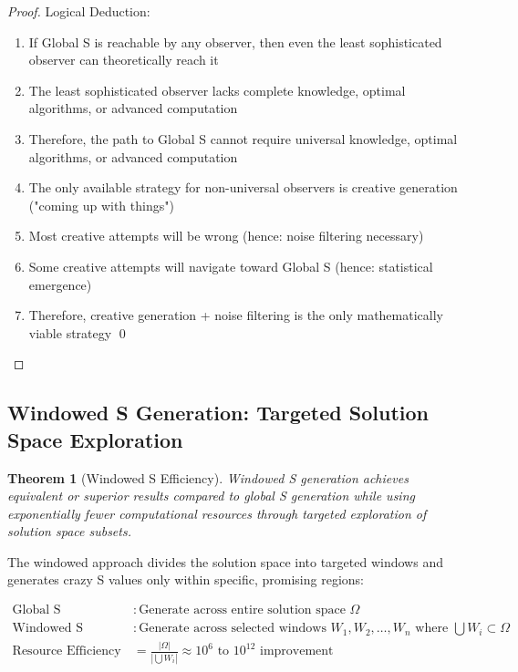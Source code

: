 \documentclass[12pt,a4paper]{article}
\newtheorem{theorem}{Theorem}[section]
\begin{document}
{\begin{proof}
Logical Deduction:
\begin{enumerate}
\item If Global S is reachable by any observer, then even the least sophisticated observer can theoretically reach it
\item The least sophisticated observer lacks complete knowledge, optimal algorithms, or advanced computation
\item Therefore, the path to Global S cannot require universal knowledge, optimal algorithms, or advanced computation
\item The only available strategy for non-universal observers is creative generation ("coming up with things")
\item Most creative attempts will be wrong (hence: noise filtering necessary)
\item Some creative attempts will navigate toward Global S (hence: statistical emergence)
\item Therefore, creative generation + noise filtering is the only mathematically viable strategy \qed
\end{enumerate}
\end{proof}

\subsection{Windowed S Generation: Targeted Solution Space Exploration}

\begin{theorem}[Windowed S Efficiency]
Windowed S generation achieves equivalent or superior results compared to global S generation while using exponentially fewer computational resources through targeted exploration of solution space subsets.
\end{theorem}

The windowed approach divides the solution space into targeted windows and generates crazy S values only within specific, promising regions:

\begin{align}
\text{Global S Generation} &: \text{Generate across entire solution space } \Omega \\
\text{Windowed S Generation} &: \text{Generate across selected windows } W_1, W_2, \ldots, W_n \text{ where } \bigcup W_i \subset \Omega \\
\text{Resource Efficiency} &= \frac{|\Omega|}{|\bigcup W_i|} \approx 10^6 \text{ to } 10^{12} \text{ improvement}
\end{align}

}
\end{document}
